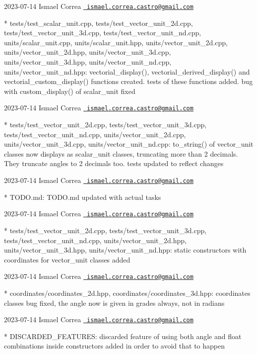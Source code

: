  2023-\/07-\/14 Ismael Correa \href{mailto:ismael.correa.castro@gmail.com}{\texttt{ ismael.\+correa.\+castro@gmail.\+com}} \begin{DoxyVerb}* tests/test_scalar_unit.cpp, tests/test_vector_unit_2d.cpp,
tests/test_vector_unit_3d.cpp, tests/test_vector_unit_nd.cpp,
units/scalar_unit.cpp, units/scalar_unit.hpp,
units/vector_unit_2d.cpp, units/vector_unit_2d.hpp,
units/vector_unit_3d.cpp, units/vector_unit_3d.hpp,
units/vector_unit_nd.cpp, units/vector_unit_nd.hpp: 
vectorial_display(), vectorial_derived_display() and
vectorial_custom_display() functions created. tests of these
functions added. bug with custom_display() of scalar_unit fixed
\end{DoxyVerb}
 2023-\/07-\/14 Ismael Correa \href{mailto:ismael.correa.castro@gmail.com}{\texttt{ ismael.\+correa.\+castro@gmail.\+com}} \begin{DoxyVerb}* tests/test_vector_unit_2d.cpp, tests/test_vector_unit_3d.cpp,
tests/test_vector_unit_nd.cpp, units/vector_unit_2d.cpp,
units/vector_unit_3d.cpp, units/vector_unit_nd.cpp: to_string() of
vector_unit classes now displays as scalar_unit classes, truncating
more than 2 decimals. They truncate angles to 2 decimals too. tests
updated to reflect changes
\end{DoxyVerb}
 2023-\/07-\/14 Ismael Correa \href{mailto:ismael.correa.castro@gmail.com}{\texttt{ ismael.\+correa.\+castro@gmail.\+com}} \begin{DoxyVerb}* TODO.md: TODO.md updated with actual tasks
\end{DoxyVerb}
 2023-\/07-\/14 Ismael Correa \href{mailto:ismael.correa.castro@gmail.com}{\texttt{ ismael.\+correa.\+castro@gmail.\+com}} \begin{DoxyVerb}* tests/test_vector_unit_2d.cpp, tests/test_vector_unit_3d.cpp,
tests/test_vector_unit_nd.cpp, units/vector_unit_2d.hpp,
units/vector_unit_3d.hpp, units/vector_unit_nd.hpp: static
constructors with coordinates for vector_unit classes added
\end{DoxyVerb}
 2023-\/07-\/14 Ismael Correa \href{mailto:ismael.correa.castro@gmail.com}{\texttt{ ismael.\+correa.\+castro@gmail.\+com}} \begin{DoxyVerb}* coordinates/coordinates_2d.hpp, coordinates/coordinates_3d.hpp: 
coordinates classes bug fixed, the angle now is given in grades
always, not in radians
\end{DoxyVerb}
 2023-\/07-\/14 Ismael Correa \href{mailto:ismael.correa.castro@gmail.com}{\texttt{ ismael.\+correa.\+castro@gmail.\+com}} \begin{DoxyVerb}* DISCARDED_FEATURES: discarded feature of using both angle and
float combinations inside constructors added in order to avoid that
to happen
\end{DoxyVerb}
